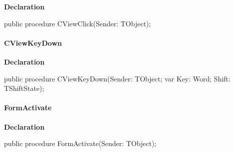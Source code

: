 \documentclass{report}
\newif\ifpdf
\begin{document}
\label{swcatalog.TSCForm-CViewClick}
\begin{list}{}{
\setlength{\itemindent}{0cm}
\setlength{\listparindent}{0cm}
\setlength{\leftmargin}{\evensidemargin}
\addtolength{\leftmargin}{\tmplength}
\settowidth{\labelsep}{X}
\addtolength{\leftmargin}{\labelsep}
\setlength{\labelwidth}{\tmplength}
}
\item[\textbf{Declaration}\hfill]
\ifpdf
\begin{flushleft}
\fi
\begin{ttfamily}
public procedure CViewClick(Sender: TObject);\end{ttfamily}

\ifpdf
\end{flushleft}
\fi

\end{list}
\paragraph*{CViewKeyDown}\hspace*{\fill}

\label{swcatalog.TSCForm-CViewKeyDown}
\begin{list}{}{
\setlength{\itemindent}{0cm}
\setlength{\listparindent}{0cm}
\setlength{\leftmargin}{\evensidemargin}
\addtolength{\leftmargin}{\tmplength}
\settowidth{\labelsep}{X}
\addtolength{\leftmargin}{\labelsep}
\setlength{\labelwidth}{\tmplength}
}
\item[\textbf{Declaration}\hfill]
\ifpdf
\begin{flushleft}
\fi
\begin{ttfamily}
public procedure CViewKeyDown(Sender: TObject; var Key: Word; Shift: TShiftState);\end{ttfamily}

\ifpdf
\end{flushleft}
\fi

\end{list}
\paragraph*{FormActivate}\hspace*{\fill}

\label{swcatalog.TSCForm-FormActivate}
\begin{list}{}{
\setlength{\itemindent}{0cm}
\setlength{\listparindent}{0cm}
\setlength{\leftmargin}{\evensidemargin}
\addtolength{\leftmargin}{\tmplength}
\settowidth{\labelsep}{X}
\addtolength{\leftmargin}{\labelsep}
\setlength{\labelwidth}{\tmplength}
}
\item[\textbf{Declaration}\hfill]
\ifpdf
\begin{flushleft}
\fi
\begin{ttfamily}
public procedure FormActivate(Sender: TObject);\end{ttfamily}

\ifpdf
\end{flushleft}
\fi

\end{list}
\end{document}
